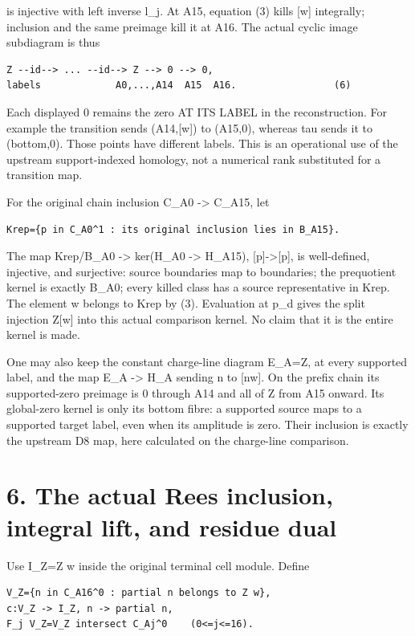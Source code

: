 \documentclass[
  10pt,
]{scrreprt}
\begin{document}
is injective with left inverse l\_j. At A15, equation (3) kills {[}w{]}
integrally; inclusion and the same preimage kill it at A16. The actual
cyclic image subdiagram is thus

\begin{verbatim}
Z --id--> ... --id--> Z --> 0 --> 0,
labels             A0,...,A14  A15  A16.                 (6)
\end{verbatim}

Each displayed 0 remains the zero AT ITS LABEL in the reconstruction.
For example the transition sends (A14,{[}w{]}) to (A15,0), whereas tau
sends it to (bottom,0). Those points have different labels. This is an
operational use of the upstream support-indexed homology, not a
numerical rank substituted for a transition map.

For the original chain inclusion C\_A0 -\textgreater{} C\_A15, let

\begin{verbatim}
Krep={p in C_A0^1 : its original inclusion lies in B_A15}.
\end{verbatim}

The map Krep/B\_A0 -\textgreater{} ker(H\_A0 -\textgreater{} H\_A15),
{[}p{]}-\textgreater{[}p{]}, is well-defined, injective, and surjective:
source boundaries map to boundaries; the prequotient kernel is exactly
B\_A0; every killed class has a source representative in Krep. The
element w belongs to Krep by (3). Evaluation at p\_d gives the split
injection Z{[}w{]} into this actual comparison kernel. No claim that it
is the entire kernel is made.

One may also keep the constant charge-line diagram E\_A=Z, at every
supported label, and the map E\_A -\textgreater{} H\_A sending n to
{[}nw{]}. On the prefix chain its supported-zero preimage is 0 through
A14 and all of Z from A15 onward. Its global-zero kernel is only its
bottom fibre: a supported source maps to a supported target label, even
when its amplitude is zero. Their inclusion is exactly the upstream D8
map, here calculated on the charge-line comparison.

\section{6. The actual Rees inclusion, integral lift, and residue
dual}\label{edition-8-section-9}

Use I\_Z=Z w inside the original terminal cell module. Define

\begin{verbatim}
V_Z={n in C_A16^0 : partial n belongs to Z w},
c:V_Z -> I_Z, n -> partial n,
F_j V_Z=V_Z intersect C_Aj^0    (0<=j<=16).
\end{verbatim}
\end{document}
